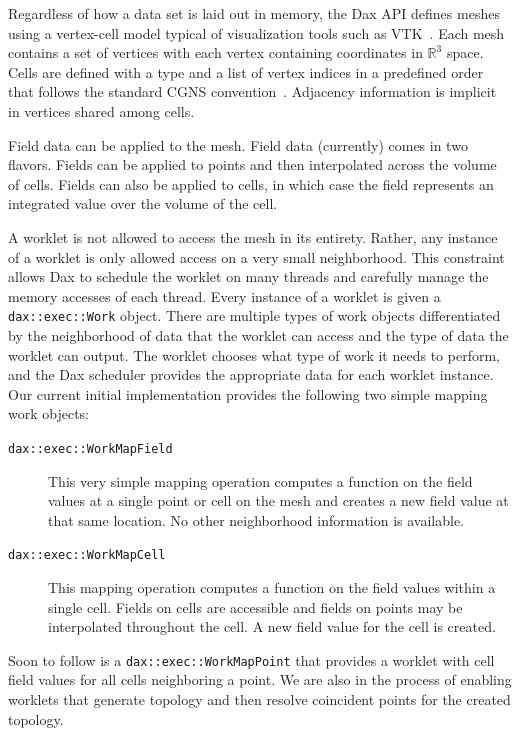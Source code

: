 \documentclass{vgtc}                          %
\newcommand*{\textC}[1]{\texttt{#1}}
\newcommand{\asterisk}{\textasteriskcentered}
\newcommand*{\lcite}[1]{~\cite{#1}}
\begin{document}
Regardless of how a data set is laid out in memory, the Dax API defines
meshes using a vertex-cell model typical of visualization tools such as
VTK\lcite{VTKBook}.  Each mesh contains a set of vertices with each vertex
containing coordinates in $\mathds{R}^3$ space.  Cells are defined with a
type and a list of vertex indices in a predefined order that follows the
standard CGNS convention\lcite{CGNSConvention}.  Adjacency information is
implicit in vertices shared among cells.

Field data can be applied to the mesh.  Field data (currently) comes in two
flavors.  Fields can be applied to points and then interpolated across the
volume of cells.  Fields can also be applied to cells, in which case the
field represents an integrated value over the volume of the cell.

A worklet is not allowed to access the mesh in its entirety.  Rather, any
instance of a worklet is only allowed access on a very small neighborhood.
This constraint allows Dax to schedule the worklet on many threads and
carefully manage the memory accesses of each thread.  Every instance of a
worklet is given a \textC{dax::exec::Work\asterisk} object.  There are
multiple types of work objects differentiated by the neighborhood of data
that the worklet can access and the type of data the worklet can output.
The worklet chooses what type of work it needs to perform, and the Dax
scheduler provides the appropriate data for each worklet instance.  Our
current initial implementation provides the following two simple mapping
work objects:
\begin{description}
\item[\textC{dax::exec::WorkMapField}] This very simple mapping operation
  computes a function on the field values at a single point or cell on the
  mesh and creates a new field value at that same location.  No other
  neighborhood information is available.
\item[\textC{dax::exec::WorkMapCell}] This mapping operation computes a
  function on the field values within a single cell.  Fields on cells are
  accessible and fields on points may be interpolated throughout the cell.
  A new field value for the cell is created.
\end{description}
Soon to follow is a \textC{dax::exec::WorkMapPoint} that provides a worklet
with cell field values for all cells neighboring a point.  We are also in
the process of enabling worklets that generate topology and then resolve
coincident points for the created topology.
\end{document}
